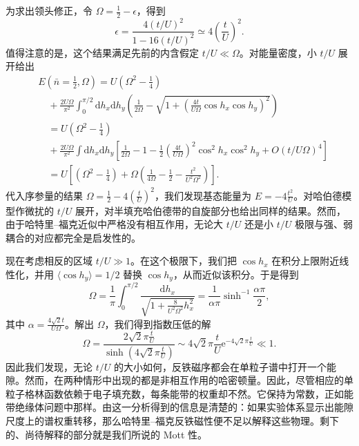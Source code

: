为求出领头修正，令 $\Omega=\frac{1}{2}-\epsilon$，得到
\begin{equation*}
\epsilon=\frac{4(t/U)^{2}}{1-16(t/U)^{2}}\simeq 4\left(\frac{t}{U}\right)^{2}.\tag{16.74}
\end{equation*}
值得注意的是，这个结果满足先前的内含假定 $t/U\ll\Omega$。对能量密度，小 $t/U$ 展开给出
\begin{align*}
&E(\bar{n}=\tfrac{1}{2},\Omega)=U\left(\Omega^{2}-\frac{1}{4}\right)\\
&\quad+\frac{2U\Omega}{\pi^{2}}\int_{0}^{\pi/2}\mathrm{d}h_{x}\mathrm{d}h_{y}\left(\frac{1}{2\Omega}-\sqrt{1+\left(\frac{4t}{U\Omega}\cos h_{x}\cos h_{y}\right)^{2}}\right)\\
&\quad=U\left(\Omega^{2}-\frac{1}{4}\right)\\
&\quad+\frac{2U\Omega}{\pi^{2}}\int\mathrm{d}h_{x}\mathrm{d}h_{y}\left[\frac{1}{2\Omega}-1-\frac{1}{2}\left(\frac{4t}{U\Omega}\right)^{2}\cos^{2}h_{x}\cos^{2}h_{y}+O(t/U\Omega)^{4}\right]\\
&\quad=U\left[\left(\Omega^{2}-\frac{1}{4}\right)+\Omega\left(\frac{1}{4\Omega}-\frac{1}{2}-\frac{t^{2}}{U^{2}\Omega^{2}}\right)\right].\tag{16.75}
\end{align*}
代入序参量的结果 $\Omega=\frac{1}{2}-4\left(\frac{t}{U}\right)^{2}$，我们发现基态能量为 $E=-4\frac{t^{2}}{U}$。对哈伯德模型作微扰的 $t/U$ 展开，对半填充哈伯德带的自旋部分也给出同样的结果。然而，由于哈特里--福克近似中严格没有相互作用，无论大 $t/U$ 还是小 $t/U$ 极限与强、弱耦合的对应都完全是启发性的。

现在考虑相反的区域 $t/U\gg 1$。在这个极限下，我们把 $\cos h_{x}$ 在积分上限附近线性化，并用 $\langle\cos h_{y}\rangle=1/2$ 替换 $\cos h_{y}$，从而近似该积分。于是得到
\begin{equation*}
\Omega=\frac{1}{\pi}\int_{0}^{\pi/2}\frac{\mathrm{d}h_{x}}{\sqrt{1+\frac{8}{U^{2}\Omega^{2}}h_{x}^{2}}}=\frac{1}{\alpha\pi}\sinh^{-1}\frac{\alpha\pi}{2},\tag{16.76}
\end{equation*}
其中 $\alpha=\frac{4\sqrt{2}t}{U\Omega}$。解出 $\Omega$，我们得到指数压低的解
\begin{equation*}
\Omega=\frac{2\sqrt{2}\pi\frac{t}{U}}{\sinh(4\sqrt{2}\pi\frac{t}{U})}\sim 4\sqrt{2}\pi\frac{t}{U}\mathrm{e}^{-4\sqrt{2}\pi\frac{t}{U}}\ll 1.\tag{16.77}
\end{equation*}
因此我们发现，无论 $t/U$ 的大小如何，反铁磁序都会在单粒子谱中打开一个能隙。然而，在两种情形中出现的都是非相互作用的哈密顿量。因此，尽管相应的单粒子格林函数依赖于电子填充数，每条能带的权重却不然。它保持为常数，正如能带绝缘体问题中那样。由这一分析得到的信息是清楚的：如果实验体系显示出能隙尺度上的谱权重转移，那么哈特里--福克反铁磁性便不足以解释这些物理。剩下的、尚待解释的部分就是我们所说的 Mott 性。

